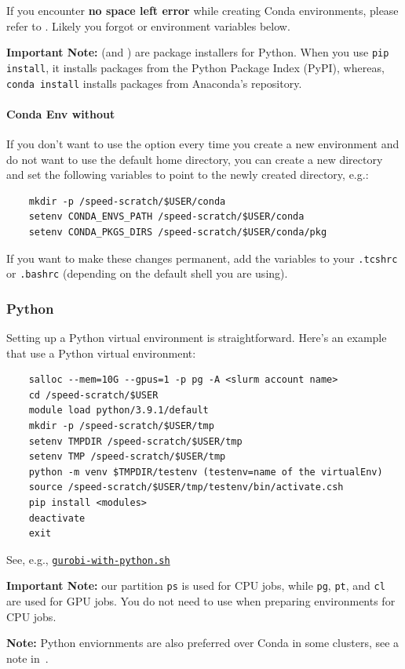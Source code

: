 \noindent If you encounter \textbf{no space left error} while creating Conda environments, please refer to
.
Likely you forgot  or environment variables below.

\textbf{Important Note:}  (and ) are package installers for Python. When you use
\texttt{pip install}, it installs packages from the Python Package Index (PyPI), whereas,
\texttt{conda install} installs packages from Anaconda's repository.

\paragraph{Conda Env without }

If you don't want to use the  option every time you create a new environment and
do not want to use the default home directory, you can create a new directory and set the following
variables to point to the newly created directory, e.g.:
\begin{verbatim}
    mkdir -p /speed-scratch/$USER/conda
    setenv CONDA_ENVS_PATH /speed-scratch/$USER/conda
    setenv CONDA_PKGS_DIRS /speed-scratch/$USER/conda/pkg
\end{verbatim}

\noindent If you want to make these changes permanent, add the variables to your \texttt{.tcshrc}
or \texttt{.bashrc} (depending on the default shell you are using).


\subsubsection{Python}
\label{sect:python-venv}

Setting up a Python virtual environment is straightforward.
Here's an example that use a Python virtual environment:

\begin{verbatim}
    salloc --mem=10G --gpus=1 -p pg -A <slurm account name>
    cd /speed-scratch/$USER
    module load python/3.9.1/default
    mkdir -p /speed-scratch/$USER/tmp
    setenv TMPDIR /speed-scratch/$USER/tmp
    setenv TMP /speed-scratch/$USER/tmp
    python -m venv $TMPDIR/testenv (testenv=name of the virtualEnv)
    source /speed-scratch/$USER/tmp/testenv/bin/activate.csh
    pip install <modules>
    deactivate
    exit
\end{verbatim}

\noindent See, e.g.,
\href{https://github.com/NAG-DevOps/speed-hpc/blob/master/src/gurobi-with-python.sh}
{\texttt{gurobi-with-python.sh}}

\noindent\textbf{Important Note:} our partition \texttt{ps} is used for CPU jobs, while \texttt{pg},
\texttt{pt}, and \texttt{cl} are used for GPU jobs. You do not need to use 
when preparing environments for CPU jobs.

\noindent\textbf{Note:} Python enviornments are also preferred over Conda
in some clusters, see a note in~.